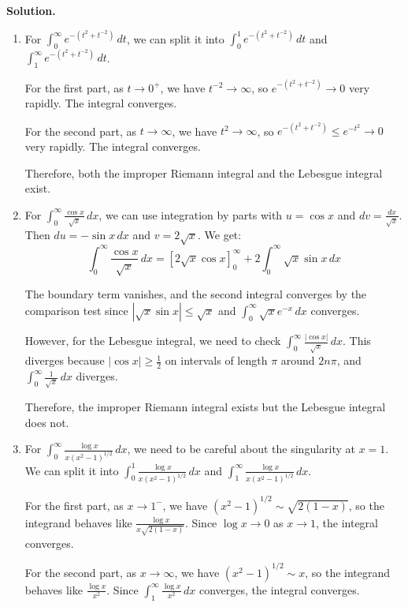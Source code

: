 \noindent\textbf{Solution.}
\begin{enumerate}[label=(\alph*)]
    \item For $\int_{0}^{\infty} e^{-(t^2 + t^{-2})} \, dt$, we can split it into $\int_{0}^{1} e^{-(t^2 + t^{-2})} \, dt$ and $\int_{1}^{\infty} e^{-(t^2 + t^{-2})} \, dt$.
    
    For the first part, as $t \to 0^+$, we have $t^{-2} \to \infty$, so $e^{-(t^2 + t^{-2})} \to 0$ very rapidly. The integral converges.
    
    For the second part, as $t \to \infty$, we have $t^2 \to \infty$, so $e^{-(t^2 + t^{-2})} \leq e^{-t^2} \to 0$ very rapidly. The integral converges.
    
    Therefore, both the improper Riemann integral and the Lebesgue integral exist.
    
    \item For $\int_{0}^{\infty} \frac{\cos x}{\sqrt{x}} \, dx$, we can use integration by parts with $u = \cos x$ and $dv = \frac{dx}{\sqrt{x}}$. Then $du = -\sin x \, dx$ and $v = 2\sqrt{x}$. We get:
    \[\int_{0}^{\infty} \frac{\cos x}{\sqrt{x}} \, dx = \left[2\sqrt{x} \cos x\right]_{0}^{\infty} + 2 \int_{0}^{\infty} \sqrt{x} \sin x \, dx\]
    
    The boundary term vanishes, and the second integral converges by the comparison test since $|\sqrt{x} \sin x| \leq \sqrt{x}$ and $\int_{0}^{\infty} \sqrt{x} e^{-x} \, dx$ converges.
    
    However, for the Lebesgue integral, we need to check $\int_{0}^{\infty} \frac{|\cos x|}{\sqrt{x}} \, dx$. This diverges because $|\cos x| \geq \frac{1}{2}$ on intervals of length $\pi$ around $2n\pi$, and $\int_{0}^{\infty} \frac{1}{\sqrt{x}} \, dx$ diverges.
    
    Therefore, the improper Riemann integral exists but the Lebesgue integral does not.
    
    \item For $\int_{0}^{\infty} \frac{\log x}{x(x^2 - 1)^{1/2}} \, dx$, we need to be careful about the singularity at $x = 1$. We can split it into $\int_{0}^{1} \frac{\log x}{x(x^2 - 1)^{1/2}} \, dx$ and $\int_{1}^{\infty} \frac{\log x}{x(x^2 - 1)^{1/2}} \, dx$.
    
    For the first part, as $x \to 1^-$, we have $(x^2 - 1)^{1/2} \sim \sqrt{2(1-x)}$, so the integrand behaves like $\frac{\log x}{x\sqrt{2(1-x)}}$. Since $\log x \to 0$ as $x \to 1$, the integral converges.
    
    For the second part, as $x \to \infty$, we have $(x^2 - 1)^{1/2} \sim x$, so the integrand behaves like $\frac{\log x}{x^2}$. Since $\int_{1}^{\infty} \frac{\log x}{x^2} \, dx$ converges, the integral converges.
    

\end{enumerate}

